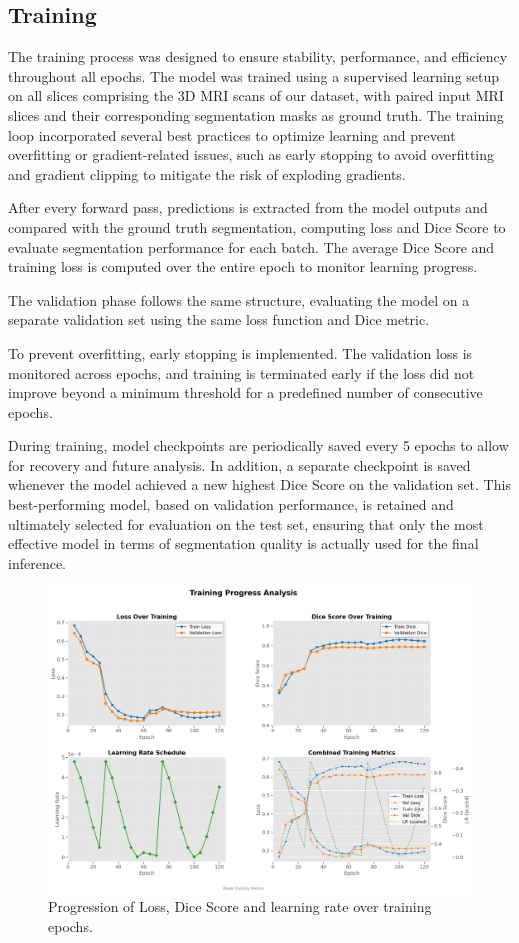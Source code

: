 \documentclass[10pt,twocolumn,letterpaper]{article}
\begin{document}
\subsection{Training}
The training process was designed to ensure stability, performance, and efficiency throughout all epochs. The model was trained using a supervised learning setup on all slices comprising the 3D MRI scans of our dataset, with paired input MRI slices and their corresponding segmentation masks as ground truth. The training loop incorporated several best practices to optimize learning and prevent overfitting or gradient-related issues, such as early stopping to avoid overfitting and gradient clipping to mitigate the risk of exploding gradients.

After every forward pass, predictions is extracted from the model outputs and compared with the ground truth segmentation, computing loss and Dice Score to evaluate segmentation performance for each batch. The average Dice Score and training loss is computed over the entire epoch to monitor learning progress.

The validation phase follows the same structure, evaluating the model on a separate validation set using the same loss function and Dice metric.

To prevent overfitting, early stopping is implemented. The validation loss is monitored across epochs, and training is terminated early if the loss did not improve beyond a minimum threshold for a predefined number of consecutive epochs.

During training, model checkpoints are periodically saved every 5 epochs to allow for recovery and future analysis. In addition, a separate checkpoint is saved whenever the model achieved a new highest Dice Score on the validation set. This best-performing model, based on validation performance, is retained and ultimately selected for evaluation on the test set, ensuring that only the most effective model in terms of segmentation quality is actually used for the final inference.

\begin{figure}[H]
    \centering
    \includegraphics[width=\linewidth]{img/training4mb.png}
    \caption{Progression of Loss, Dice Score and learning rate over training epochs.}
\end{figure}
\end{document}
